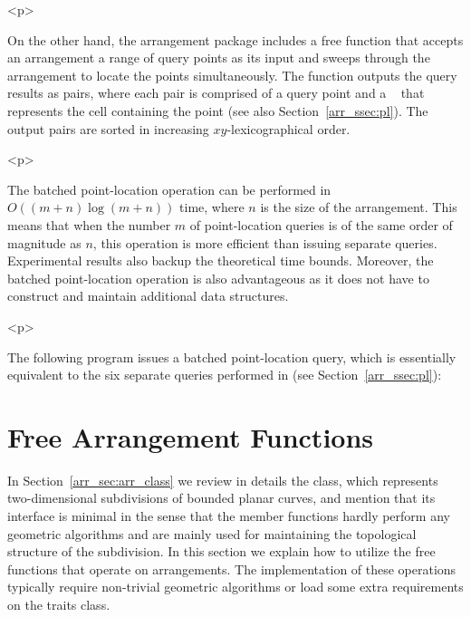 \begin{ccHtmlOnly}<p>\end{ccHtmlOnly}
On the other hand, the arrangement package includes a free
 function that accepts an arrangement a range of
query points as its input and sweeps through the arrangement to
locate the points simultaneously. The function outputs the query
results as pairs, where each pair is comprised of a query point
and a \cgal\  that represents the cell containing the
point (see also Section~\ref{arr_ssec:pl}). The output pairs are
sorted in increasing $xy$-lexicographical order.

\begin{ccHtmlOnly}<p>\end{ccHtmlOnly}
The batched point-location operation can be performed in
$O\left((m+n)\log{(m+n)}\right)$ time, where $n$ is the size of
the arrangement. This means that when the number $m$ of
point-location queries is of the same order of magnitude as $n$,
this operation is more efficient than issuing separate queries.
Experimental results also backup the theoretical time bounds.
Moreover, the batched point-location operation is also
advantageous as it does not have to construct and maintain
additional data structures.

\begin{ccHtmlOnly}<p>\end{ccHtmlOnly}
The following program issues a batched point-location query, which
is essentially equivalent to the six separate queries performed in
 (see Section~\ref{arr_ssec:pl}):


\section{Free Arrangement Functions}
\label{arr_sec:gl_funcs}
%
In Section~\ref{arr_sec:arr_class} we review in details the
 class, which represents two-dimensional
subdivisions of bounded planar curves, and mention that its
interface is minimal in the sense that the member functions hardly
perform any geometric algorithms and are mainly used for
maintaining the topological structure of the subdivision. In this
section we explain how to utilize the free functions that operate on
arrangements. The implementation of these operations typically require
non-trivial geometric algorithms or load some extra requirements on
the traits class.

